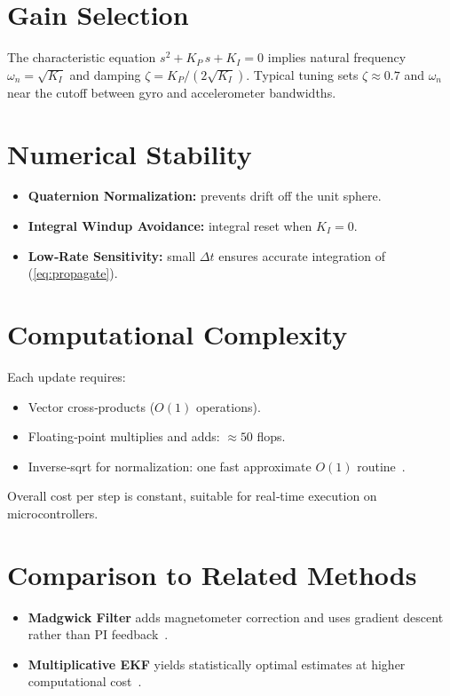 \documentclass[12pt]{article}
\begin{document}
\section{Gain Selection}
The characteristic equation \(s^2 + K_P\,s + K_I=0\) implies natural frequency \(\omega_n=\sqrt{K_I}\) and damping \(\zeta=K_P/(2\sqrt{K_I})\).  Typical tuning sets \(\zeta\approx0.7\) and \(\omega_n\) near the cutoff between gyro and accelerometer bandwidths.

\section{Numerical Stability}
\begin{itemize}
  \item \textbf{Quaternion Normalization:} prevents drift off the unit sphere.
  \item \textbf{Integral Windup Avoidance:} integral reset when \(K_I=0\).
  \item \textbf{Low‐Rate Sensitivity:} small \(\Delta t\) ensures accurate integration of (\ref{eq:propagate}).
\end{itemize}

\section{Computational Complexity}
Each update requires:
\begin{itemize}
  \item Vector cross‐products (\(O(1)\) operations).
  \item Floating‐point multiplies and adds: \(\approx50\) flops.
  \item Inverse‐sqrt for normalization: one fast approximate \(O(1)\) routine~\cite{Quake2002}.
\end{itemize}
Overall cost per step is constant, suitable for real‐time execution on microcontrollers.

\section{Comparison to Related Methods}
\begin{itemize}
  \item \textbf{Madgwick Filter} adds magnetometer correction and uses gradient descent rather than PI feedback~\cite{Madgwick2010}.
  \item \textbf{Multiplicative EKF} yields statistically optimal estimates at higher computational cost~\cite{Lefferts1982,Markley2003}.
\end{itemize}
\end{document}
